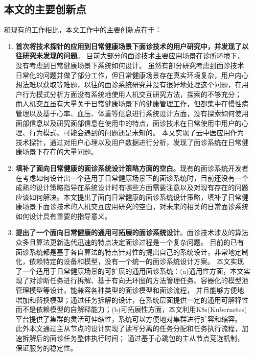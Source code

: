 \subsection{本文的主要创新点}
和现有的工作相比，本文工作中的主要创新点在于：
\begin{enumerate}
    \item \textbf{首次将技术探针的应用到日常健康场景下面诊技术的用户研究中，并发现了以往研究未发现的问题}。
    目前大部分的面诊技术主要应用场景在诊所环境下，没有考虑到日常健康场景下系统如何设计。
虽然有部分研究考虑到面诊技术日常化的问题并做了部分工作，但日常健康场景存在真实环境复杂，用户内心想法难以获取等难题，以往的面诊系统研究并没有很好地处理这个问题，在用户行为模式分析方面没有系统地使用人机交互研究方法，探索的不够充分；
而人机交互虽有大量关于日常健康场景下的健康管理工作，但都集中在慢性病管理以及基于心率、血压、体重等信息进行系统设计方面，没有探索如何使用面部信息以及研究面部信息在使用中的特点，面诊技术在日常使用中用户的心理、行为模式、可能会遇到的问题还是未知的。
本文实现了云中医应用作为技术探针，通过对用户心理以及用户数据进行分析，发现了面诊系统在日常健康场景下存在的大量问题。

\item \textbf{填补了面向日常健康的面诊系统设计策略方面的空白}。现有的面诊系统开发者在考虑如何设计出一个适用于日常健康场景下的面诊系统时，目前还没有一个成熟的设计策略指导在系统设计时有哪些方面需要注意以及对现有存在的问题应该如何解决。本文提出了面向日常健康的面诊系统设计策略，填补了日常健康场景下面诊技术的人机交互应用研究的空白\cite{ding2019reading}，对未来的相关的日常面诊系统如何设计具有重要的指导意义。 

\item \textbf{提出了一个面向日常健康的通用可拓展的面诊系统设计}。面诊技术涉及的算法众多且算法更新迭代迅速的特点决定面诊过程是一个复杂问题。
    目前的已有面诊系统都是基于各自算法的特点针对性的提出自己的系统设计，非常地定制化，依赖特定的设备和模型，没有一个统一的面诊系统设计方案。
    本文实现了一个适用于日常健康场景的可扩展的通用面诊系统：(a)通用性方面，本文实现了对诊断任务进行拆解、基于有向无环图的方法管理任务、容器化的模型池管理模型等设计，能兼容各种类型的面诊模型和面诊流程，
            并且能够方便地增加和替换模型；通过任务拆解的设计，在系统层面提供一定的通用可解释性而不是依赖模型的自解释能力；(b)可拓展性方面，本文利用K8s(Kubernetes)平台提供了集群的灵活可伸缩性，系统可以方便地对集群进行扩容和缩容。
            此外本文通过主从节点的设计实现了读写分离的任务分配和任务执行流程，加速拆解后的面诊任务整体执行时间；
            通过基于心跳包的主从节点竞选机制，保证服务的稳定性。
\end{enumerate}

